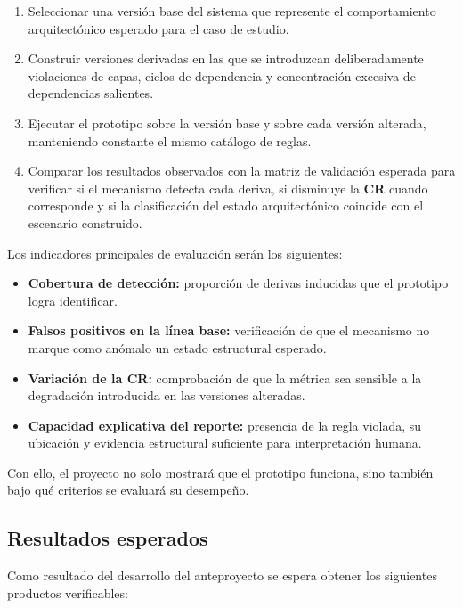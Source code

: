 \begin{enumerate}
    \item Seleccionar una versión base del sistema que represente el comportamiento arquitectónico esperado para el caso de estudio.
    \item Construir versiones derivadas en las que se introduzcan deliberadamente violaciones de capas, ciclos de dependencia y concentración excesiva de dependencias salientes.
    \item Ejecutar el prototipo sobre la versión base y sobre cada versión alterada, manteniendo constante el mismo catálogo de reglas.
    \item Comparar los resultados observados con la matriz de validación esperada para verificar si el mecanismo detecta cada deriva, si disminuye la \textbf{CR} cuando corresponde y si la clasificación del estado arquitectónico coincide con el escenario construido.
\end{enumerate}

Los indicadores principales de evaluación serán los siguientes:

\begin{itemize}
    \item \textbf{Cobertura de detección:} proporción de derivas inducidas que el prototipo logra identificar.
    \item \textbf{Falsos positivos en la línea base:} verificación de que el mecanismo no marque como anómalo un estado estructural esperado.
    \item \textbf{Variación de la CR:} comprobación de que la métrica sea sensible a la degradación introducida en las versiones alteradas.
    \item \textbf{Capacidad explicativa del reporte:} presencia de la regla violada, su ubicación y evidencia estructural suficiente para interpretación humana.
\end{itemize}

Con ello, el proyecto no solo mostrará que el prototipo funciona, sino también bajo qué criterios se evaluará su desempeño.

\subsection{Resultados esperados}

Como resultado del desarrollo del anteproyecto se espera obtener los siguientes productos verificables:

